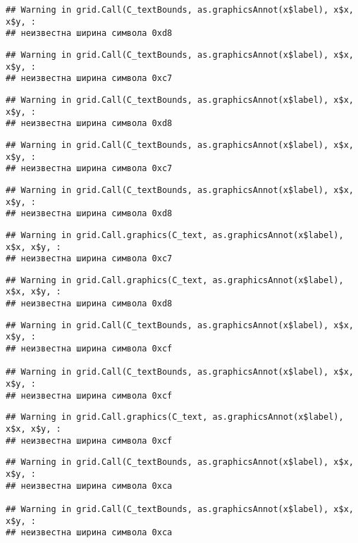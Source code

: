 \documentclass[
]{article}
\begin{document}
\begin{verbatim}
## Warning in grid.Call(C_textBounds, as.graphicsAnnot(x$label), x$x, x$y, :
## неизвестна ширина символа 0xd8
\end{verbatim}

\begin{verbatim}
## Warning in grid.Call(C_textBounds, as.graphicsAnnot(x$label), x$x, x$y, :
## неизвестна ширина символа 0xc7
\end{verbatim}

\begin{verbatim}
## Warning in grid.Call(C_textBounds, as.graphicsAnnot(x$label), x$x, x$y, :
## неизвестна ширина символа 0xd8
\end{verbatim}

\begin{verbatim}
## Warning in grid.Call(C_textBounds, as.graphicsAnnot(x$label), x$x, x$y, :
## неизвестна ширина символа 0xc7
\end{verbatim}

\begin{verbatim}
## Warning in grid.Call(C_textBounds, as.graphicsAnnot(x$label), x$x, x$y, :
## неизвестна ширина символа 0xd8
\end{verbatim}

\begin{verbatim}
## Warning in grid.Call.graphics(C_text, as.graphicsAnnot(x$label), x$x, x$y, :
## неизвестна ширина символа 0xc7
\end{verbatim}

\begin{verbatim}
## Warning in grid.Call.graphics(C_text, as.graphicsAnnot(x$label), x$x, x$y, :
## неизвестна ширина символа 0xd8
\end{verbatim}

\begin{verbatim}
## Warning in grid.Call(C_textBounds, as.graphicsAnnot(x$label), x$x, x$y, :
## неизвестна ширина символа 0xcf

## Warning in grid.Call(C_textBounds, as.graphicsAnnot(x$label), x$x, x$y, :
## неизвестна ширина символа 0xcf
\end{verbatim}

\begin{verbatim}
## Warning in grid.Call.graphics(C_text, as.graphicsAnnot(x$label), x$x, x$y, :
## неизвестна ширина символа 0xcf
\end{verbatim}

\begin{verbatim}
## Warning in grid.Call(C_textBounds, as.graphicsAnnot(x$label), x$x, x$y, :
## неизвестна ширина символа 0xca

## Warning in grid.Call(C_textBounds, as.graphicsAnnot(x$label), x$x, x$y, :
## неизвестна ширина символа 0xca
\end{verbatim}
\end{document}
